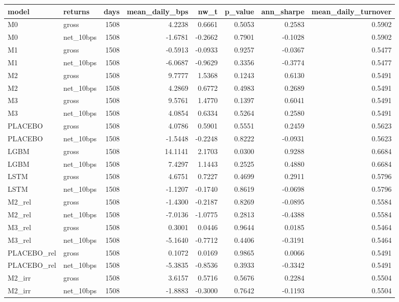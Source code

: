 \begin{tabular}{llrrrrrr}
\toprule
model & returns & days & mean\_daily\_bps & nw\_t & p\_value & ann\_sharpe & mean\_daily\_turnover \\
\midrule
M0 & gross & 1508 & 4.2238 & 0.6661 & 0.5053 & 0.2583 & 0.5902 \\
M0 & net\_10bps & 1508 & -1.6781 & -0.2662 & 0.7901 & -0.1028 & 0.5902 \\
M1 & gross & 1508 & -0.5913 & -0.0933 & 0.9257 & -0.0367 & 0.5477 \\
M1 & net\_10bps & 1508 & -6.0687 & -0.9629 & 0.3356 & -0.3774 & 0.5477 \\
M2 & gross & 1508 & 9.7777 & 1.5368 & 0.1243 & 0.6130 & 0.5491 \\
M2 & net\_10bps & 1508 & 4.2869 & 0.6772 & 0.4983 & 0.2689 & 0.5491 \\
M3 & gross & 1508 & 9.5761 & 1.4770 & 0.1397 & 0.6041 & 0.5491 \\
M3 & net\_10bps & 1508 & 4.0854 & 0.6334 & 0.5264 & 0.2580 & 0.5491 \\
PLACEBO & gross & 1508 & 4.0786 & 0.5901 & 0.5551 & 0.2459 & 0.5623 \\
PLACEBO & net\_10bps & 1508 & -1.5448 & -0.2248 & 0.8222 & -0.0931 & 0.5623 \\
LGBM & gross & 1508 & 14.1141 & 2.1703 & 0.0300 & 0.9288 & 0.6684 \\
LGBM & net\_10bps & 1508 & 7.4297 & 1.1443 & 0.2525 & 0.4880 & 0.6684 \\
LSTM & gross & 1508 & 4.6751 & 0.7227 & 0.4699 & 0.2911 & 0.5796 \\
LSTM & net\_10bps & 1508 & -1.1207 & -0.1740 & 0.8619 & -0.0698 & 0.5796 \\
M2\_rel & gross & 1508 & -1.4300 & -0.2187 & 0.8269 & -0.0895 & 0.5584 \\
M2\_rel & net\_10bps & 1508 & -7.0136 & -1.0775 & 0.2813 & -0.4388 & 0.5584 \\
M3\_rel & gross & 1508 & 0.3001 & 0.0446 & 0.9644 & 0.0185 & 0.5464 \\
M3\_rel & net\_10bps & 1508 & -5.1640 & -0.7712 & 0.4406 & -0.3191 & 0.5464 \\
PLACEBO\_rel & gross & 1508 & 0.1072 & 0.0169 & 0.9865 & 0.0066 & 0.5491 \\
PLACEBO\_rel & net\_10bps & 1508 & -5.3835 & -0.8536 & 0.3933 & -0.3342 & 0.5491 \\
M2\_irr & gross & 1508 & 3.6157 & 0.5716 & 0.5676 & 0.2284 & 0.5504 \\
M2\_irr & net\_10bps & 1508 & -1.8883 & -0.3000 & 0.7642 & -0.1193 & 0.5504 \\

\end{tabular}
